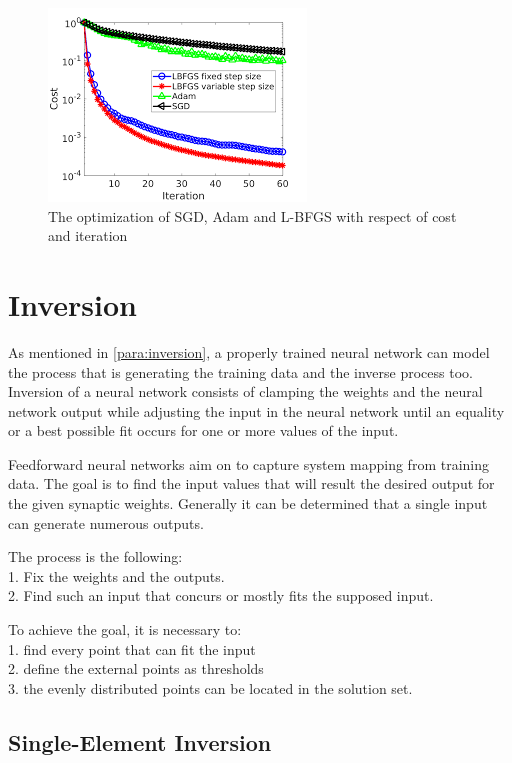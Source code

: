 \begin{figure}[h]
	\centering
	\includegraphics[height=0.34\linewidth]{./figures/optimization}
	\caption{The optimization of SGD, Adam and L-BFGS with respect of cost and iteration}
	\label{fig:optimization}
\end{figure}





\section{Inversion}

As mentioned in \autoref{para:inversion}, a properly trained neural network can model the process that is generating the training data and the inverse process too. Inversion of a neural network consists of clamping the weights and the neural network output while adjusting the input in the neural network until an equality or a best possible fit occurs for one or more values of the input. \medskip

Feedforward neural networks aim on to capture system mapping from training data. The goal is to find the input values that will result the desired output for the given synaptic weights. Generally it can be determined that a single input can generate numerous outputs. \smallskip

\noindent The process is the following:\\
1. Fix the weights and the outputs.\\
2. Find such an input that concurs or mostly fits the supposed input. \medskip

\noindent To achieve the goal, it is necessary to:\\
1. find every point that can fit the input\\
2. define the external points as thresholds\\
3. the evenly distributed points can be located in the solution set.



\subsection{Single-Element Inversion}

